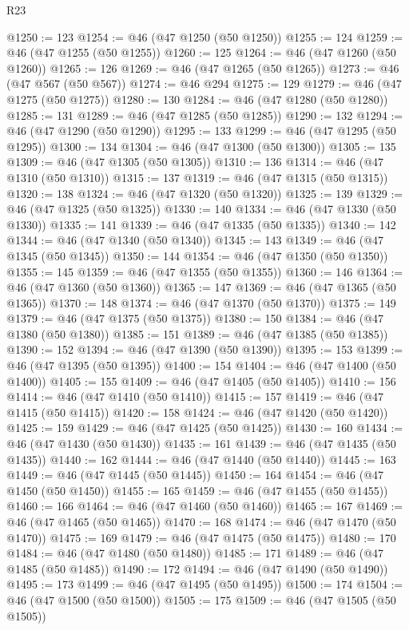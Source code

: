 \begin{lexlean}{R23}
\begin{coremodule}
{{{{{{{{{{{{{{{{{{{{{@1250 := 123
@1254 := @46 (@47 @1250 (@50 @1250))
@1255 := 124
@1259 := @46 (@47 @1255 (@50 @1255))
@1260 := 125
@1264 := @46 (@47 @1260 (@50 @1260))
@1265 := 126
@1269 := @46 (@47 @1265 (@50 @1265))
@1273 := @46 (@47 @567 (@50 @567))
@1274 := @46 @294
@1275 := 129
@1279 := @46 (@47 @1275 (@50 @1275))
@1280 := 130
@1284 := @46 (@47 @1280 (@50 @1280))
@1285 := 131
@1289 := @46 (@47 @1285 (@50 @1285))
@1290 := 132
@1294 := @46 (@47 @1290 (@50 @1290))
@1295 := 133
@1299 := @46 (@47 @1295 (@50 @1295))
@1300 := 134
@1304 := @46 (@47 @1300 (@50 @1300))
@1305 := 135
@1309 := @46 (@47 @1305 (@50 @1305))
@1310 := 136
@1314 := @46 (@47 @1310 (@50 @1310))
@1315 := 137
@1319 := @46 (@47 @1315 (@50 @1315))
@1320 := 138
@1324 := @46 (@47 @1320 (@50 @1320))
@1325 := 139
@1329 := @46 (@47 @1325 (@50 @1325))
@1330 := 140
@1334 := @46 (@47 @1330 (@50 @1330))
@1335 := 141
@1339 := @46 (@47 @1335 (@50 @1335))
@1340 := 142
@1344 := @46 (@47 @1340 (@50 @1340))
@1345 := 143
@1349 := @46 (@47 @1345 (@50 @1345))
@1350 := 144
@1354 := @46 (@47 @1350 (@50 @1350))
@1355 := 145
@1359 := @46 (@47 @1355 (@50 @1355))
@1360 := 146
@1364 := @46 (@47 @1360 (@50 @1360))
@1365 := 147
@1369 := @46 (@47 @1365 (@50 @1365))
@1370 := 148
@1374 := @46 (@47 @1370 (@50 @1370))
@1375 := 149
@1379 := @46 (@47 @1375 (@50 @1375))
@1380 := 150
@1384 := @46 (@47 @1380 (@50 @1380))
@1385 := 151
@1389 := @46 (@47 @1385 (@50 @1385))
@1390 := 152
@1394 := @46 (@47 @1390 (@50 @1390))
@1395 := 153
@1399 := @46 (@47 @1395 (@50 @1395))
@1400 := 154
@1404 := @46 (@47 @1400 (@50 @1400))
@1405 := 155
@1409 := @46 (@47 @1405 (@50 @1405))
@1410 := 156
@1414 := @46 (@47 @1410 (@50 @1410))
@1415 := 157
@1419 := @46 (@47 @1415 (@50 @1415))
@1420 := 158
@1424 := @46 (@47 @1420 (@50 @1420))
@1425 := 159
@1429 := @46 (@47 @1425 (@50 @1425))
@1430 := 160
@1434 := @46 (@47 @1430 (@50 @1430))
@1435 := 161
@1439 := @46 (@47 @1435 (@50 @1435))
@1440 := 162
@1444 := @46 (@47 @1440 (@50 @1440))
@1445 := 163
@1449 := @46 (@47 @1445 (@50 @1445))
@1450 := 164
@1454 := @46 (@47 @1450 (@50 @1450))
@1455 := 165
@1459 := @46 (@47 @1455 (@50 @1455))
@1460 := 166
@1464 := @46 (@47 @1460 (@50 @1460))
@1465 := 167
@1469 := @46 (@47 @1465 (@50 @1465))
@1470 := 168
@1474 := @46 (@47 @1470 (@50 @1470))
@1475 := 169
@1479 := @46 (@47 @1475 (@50 @1475))
@1480 := 170
@1484 := @46 (@47 @1480 (@50 @1480))
@1485 := 171
@1489 := @46 (@47 @1485 (@50 @1485))
@1490 := 172
@1494 := @46 (@47 @1490 (@50 @1490))
@1495 := 173
@1499 := @46 (@47 @1495 (@50 @1495))
@1500 := 174
@1504 := @46 (@47 @1500 (@50 @1500))
@1505 := 175
@1509 := @46 (@47 @1505 (@50 @1505))
}}}}}}}}}}}}}}}}}}}}}
\end{coremodule}
\end{lexlean}
